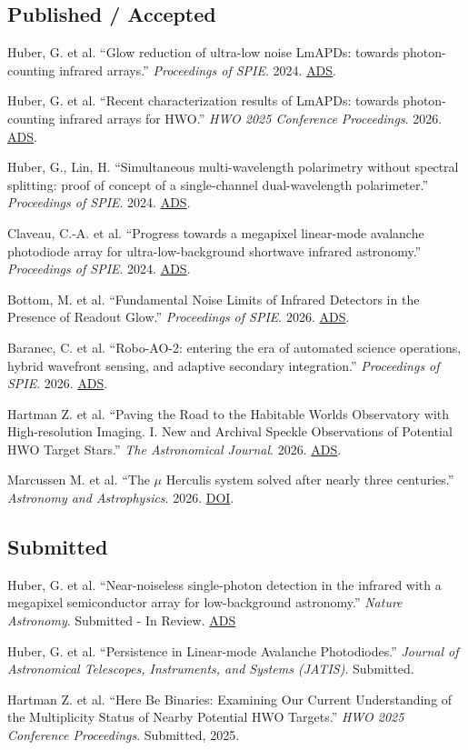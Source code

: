 \documentclass[11pt,letterpaper]{article}
\newcommand{\publication}[4]{%
  \item #1. ``#2.'' \textit{#3}. #4.
}
\begin{document}
\subsection*{Published / Accepted}
\begin{enumerate}[leftmargin=*, label={[P\arabic*]}]
  \publication
{Huber, G. et al}
{Glow reduction of ultra-low noise LmAPDs: towards photon-counting infrared arrays}
{Proceedings of SPIE}
{2024. \href{https://ui.adsabs.harvard.edu/abs/2024SPIE13103E..20H/abstract}{ADS}}
\publication{Huber, G. et al}{Recent characterization results of LmAPDs: towards photon-counting infrared arrays for HWO}{HWO 2025 Conference Proceedings}{2026. \href{https://ui.adsabs.harvard.edu/abs/2026ASPC..543..345H/abstract}{ADS}}
  \publication{Huber, G., Lin, H}{Simultaneous multi-wavelength polarimetry without spectral splitting: proof of concept of a single-channel dual-wavelength polarimeter}{Proceedings of SPIE}{2024.  \href{https://ui.adsabs.harvard.edu/abs/2024SPIE13100E..3DH/abstract}{ADS}}
  \publication{Claveau, C.-A. et al}{Progress towards a megapixel linear-mode avalanche photodiode array for ultra-low-background shortwave infrared astronomy}{Proceedings of SPIE}{2024. \href{https://ui.adsabs.harvard.edu/abs/2024arXiv241109185C/abstract}{ADS}}
  \publication{Bottom, M. et al}{Fundamental Noise Limits of Infrared Detectors in the Presence of Readout Glow}{Proceedings of SPIE}{2026.  \href{https://ui.adsabs.harvard.edu/abs/2026arXiv260800354B/abstract}{ADS}}
  \publication{Baranec, C. et al}{Robo-AO-2: entering the era of automated science operations, hybrid wavefront sensing, and adaptive secondary integration}{Proceedings of SPIE}{2026.  \href{https://ui.adsabs.harvard.edu/abs/2026arXiv260702826B/abstract}{ADS}}
  \publication{Hartman Z. et al}{Paving the Road to the Habitable Worlds Observatory with High-resolution Imaging. I. New and Archival Speckle Observations of Potential HWO Target Stars}{The Astronomical Journal}{2026. \href{https://ui.adsabs.harvard.edu/abs/2026AJ....171..174H/abstract}{ADS}}
  \publication{Marcussen M. et al}{The $\mu$ Herculis system solved after nearly three centuries}{Astronomy and Astrophysics}{2026. \href{https://doi.org/10.1051/0004-6361/202658981}{DOI}}
\end{enumerate}

\subsection*{Submitted}
\begin{enumerate}[leftmargin=*, label={[S\arabic*]}]
\publication{Huber, G. et al}{Near-noiseless single-photon detection in the infrared with a megapixel semiconductor array for low-background astronomy}{Nature Astronomy}{Submitted - In Review}\href{https://ui.adsabs.harvard.edu/abs/2026arXiv261000799H/abstract}{ADS}
\publication{Huber, G. et al}{Persistence in Linear-mode Avalanche Photodiodes}{Journal of Astronomical Telescopes, Instruments, and Systems (JATIS)}{Submitted}
\publication{Hartman Z. et al}{Here Be Binaries: Examining Our Current Understanding of the Multiplicity Status of Nearby Potential HWO Targets}{HWO 2025 Conference Proceedings}{Submitted, 2025}
\end{enumerate}
\end{document}
